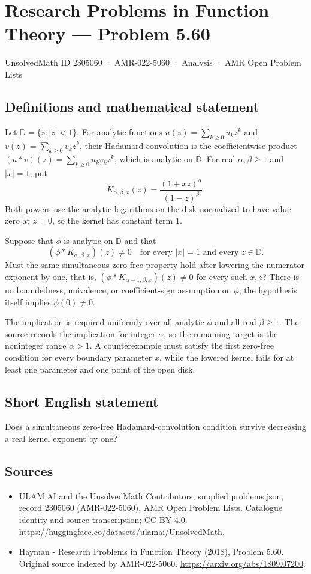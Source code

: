 \documentclass[11pt,a4paper]{article}
\begin{document}
\section*{Research Problems in Function Theory — Problem 5.60}\label{2305060}
{\small UnsolvedMath ID 2305060 · AMR-022-5060 · Analysis · AMR Open Problem Lists}
\subsection{Definitions and mathematical statement}
Let $\mathbb D=\{z:|z|<1\}$. For analytic functions
$u(z)=\sum_{k\geq0}u_kz^k$ and $v(z)=\sum_{k\geq0}v_kz^k$,
their Hadamard convolution is the coefficientwise product
$(u*v)(z)=\sum_{k\geq0}u_kv_kz^k$, which is analytic on
$\mathbb D$.
For real $\alpha,\beta\geq1$ and $|x|=1$, put
\[
 K_{\alpha,\beta,x}(z)=
       \frac{(1+xz)^\alpha}{(1-z)^\beta}.
\]
Both powers use the analytic logarithms on the disk normalized
to have value zero at $z=0$, so the kernel has constant term $1$.

Suppose that $\phi$ is analytic on $\mathbb D$ and that
\[
 (\phi*K_{\alpha,\beta,x})(z)\ne0
 \quad\text{for every }|x|=1\text{ and every }z\in\mathbb D.
\]
Must the same simultaneous zero-free property hold after lowering
the numerator exponent by one, that is,
$(\phi*K_{\alpha-1,\beta,x})(z)\ne0$ for every such $x,z$?
There is no boundedness, univalence, or coefficient-sign
assumption on $\phi$; the hypothesis itself implies
$\phi(0)\ne0$.

The implication is required uniformly over all analytic $\phi$
and all real $\beta\geq1$. The source records the implication for
integer $\alpha$, so the remaining target is the noninteger
range $\alpha>1$. A counterexample must satisfy the first
zero-free condition for every boundary parameter $x$, while
the lowered kernel fails for at least one parameter and one
point of the open disk.
\subsection{Short English statement}
Does a simultaneous zero-free Hadamard-convolution condition survive decreasing a real kernel exponent by one?
\subsection{Sources}
\begin{itemize}
\item[S1] ULAM.AI and the UnsolvedMath Contributors, supplied problems.json, record 2305060 (AMR-022-5060), AMR Open Problem Lists. Catalogue identity and source transcription; CC BY 4.0.
\url{https://huggingface.co/datasets/ulamai/UnsolvedMath}.
\item[S2] Hayman - Research Problems in Function Theory (2018), Problem 5.60. Original source indexed by AMR-022-5060.
\url{https://arxiv.org/abs/1809.07200}.
\end{itemize}
\end{document}
